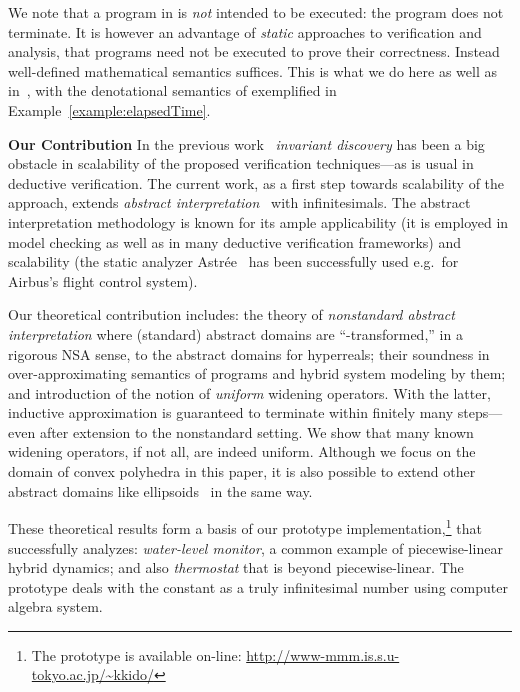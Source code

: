 \documentclass[envcountsect,orivec]{llncs} \pdfoutput=1
\theoremstyle{definition}
\begin{document}
\vspace*{.0em}


We note that
a program in  is \emph{not} intended to be executed: the program 
does not terminate. 
It is however an advantage of
\emph{static} approaches to verification and analysis,  that programs need not be executed to prove their
correctness. Instead well-defined mathematical semantics suffices. This
is what we do here as well as in~\cite{Suenaga2011,Hasuo2012,Suenaga2013}, with the denotational
semantics of  exemplified in Example~\ref{example:elapsedTime}.


\vspace*{.2em} 
\noindent
\textbf{Our Contribution}
\quad
In the previous work~\cite{Suenaga2011,Hasuo2012,Suenaga2013} \emph{invariant
discovery} has been a big obstacle in scalability of the proposed
verification techniques---as
is usual in deductive verification. The current work, as a first step
towards scalability of the approach,
extends \emph{abstract interpretation}~\cite{Cousot1977} with
infinitesimals. The  abstract interpretation methodology is known for
its ample applicability (it is employed in model checking as
well as in many deductive verification frameworks) and scalability (the static
analyzer Astr\'{e}e~\cite{Cousot2005} has been successfully used e.g.\
for Airbus's flight control system).

Our theoretical contribution includes: the theory of \emph{nonstandard
abstract interpretation} where (standard) abstract domains are ``-transformed,'' in a rigorous NSA sense, to 
the abstract domains for hyperreals; their soundness in over-approximating
semantics of  programs and hybrid system modeling by them; and introduction of the notion of
\emph{uniform} widening operators. With the latter, inductive
approximation is guaranteed to terminate within finitely many
steps---even after extension to the nonstandard setting. We show that
many known widening operators, if not all, are indeed uniform.
Although we  focus on the domain of convex polyhedra in this paper, it
is also possible to extend other abstract domains like
ellipsoids~\cite{Feret2004} 
in the same way.

These theoretical results form a basis of our prototype
implementation,\footnote{The prototype is available on-line: \href{http://www-mmm.is.s.u-tokyo.ac.jp/~kkido/}{http://www-mmm.is.s.u-tokyo.ac.jp/\~{}kkido/}} that successfully analyzes: \emph{water-level monitor},
a common example of piecewise-linear hybrid dynamics; and also
\emph{thermostat} that is beyond piecewise-linear.
The prototype deals with the constant  as a truly infinitesimal number using computer algebra system.
\end{document}
